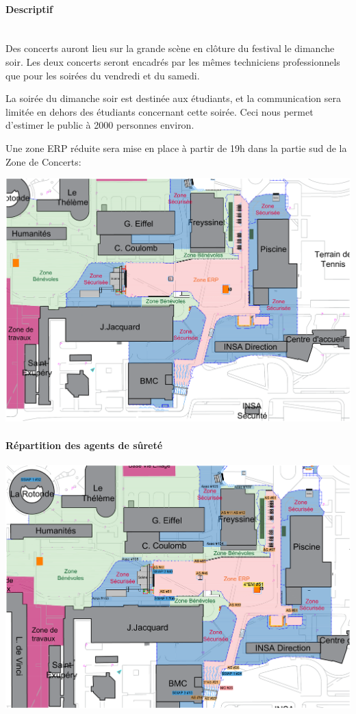 \documentclass[hidelinks, paper=a4, fontsize=13pt]{report}
\begin{document}
\paragraph{Descriptif}\mbox{}\\
Des concerts auront lieu sur la grande scène en clôture du festival le dimanche soir. Les deux concerts seront encadrés par les mêmes techniciens professionnels que pour les soirées du vendredi et du samedi. 

La soirée du dimanche soir est destinée aux étudiants, et la communication sera limitée en dehors des étudiants concernant cette soirée. Ceci nous permet d’estimer le public à 2000 personnes environ. 

Une zone ERP réduite sera mise en place à partir de 19h dans la partie sud de la Zone de Concerts:

\begin{center}
\includegraphics[width=.8\textwidth,keepaspectratio]{Exports/Plan_24h_45eme-ERP_Dimanche}

\end{center}
\newpage
\paragraph{Répartition des agents de sûreté}
\begin{center}
\includegraphics[width=\textwidth,keepaspectratio, angle=90]{Exports/Plan_24h_45eme-AS_Dimanche}
\end{center}
\end{document}
